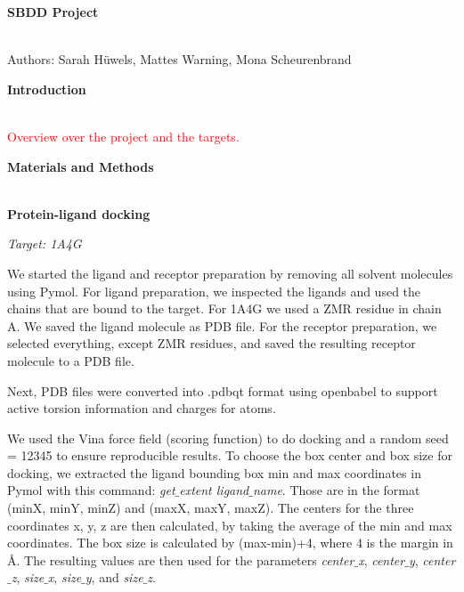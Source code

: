 \documentclass[a4paper,10pt]{article}
\begin{document}


\begin{huge}
	\vspace{1cm}
	\textbf{SBDD Project}
\end{huge} \\

Authors: Sarah Hüwels, Mattes Warning, Mona Scheurenbrand 

\begin{large}
	\vspace{0.5cm}
	\textbf{Introduction}
\end{large}	\\ [1mm]

\textcolor{red}{Overview over the project and the targets.}

\begin{large}
	\vspace{0.5cm}
	\textbf{Materials and Methods}
\end{large}	\\ [1mm]

\textbf{Protein-ligand docking}

\textit{Target: 1A4G}

We started the ligand and receptor preparation by removing all solvent molecules using Pymol. 
For ligand preparation, we inspected the ligands and used the chains that are bound to the target. For 1A4G we used a ZMR residue in chain A. We saved the ligand molecule as PDB file.
For the receptor preparation, we selected everything, except ZMR residues, and saved the resulting receptor molecule to a PDB file.

Next, PDB files were converted into .pdbqt format using openbabel to support active torsion information and charges for atoms. 

We used the Vina force field (scoring function) to do docking and a random seed = 12345 to ensure reproducible results. To choose the box center and box size for docking, we extracted the ligand bounding box min and max coordinates in Pymol with this command: \textit{get$\_$extent ligand$\_$name}. Those are in the format (minX, minY, minZ) and (maxX, maxY, maxZ). The centers for the three coordinates x, y, z are then calculated, by taking the average of the min and max coordinates. The box size is calculated by (max-min)+4, where 4 is the margin in Å. The resulting values are then used for the parameters \textit{center$\_$x}, \textit{center$\_$y}, \textit{center$\_$z}, \textit{size$\_$x}, \textit{size$\_$y}, and \textit{size$\_$z}.
\end{document}
